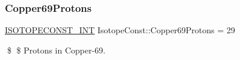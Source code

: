 \subsubsection{\texorpdfstring{Copper69\+Protons}{Copper69Protons}}
{\footnotesize\ttfamily \mbox{\hyperlink{group___isotope_const-_macros_ga5f18360b3e99483a35c32d789e62621c}{I\+S\+O\+T\+O\+P\+E\+C\+O\+N\+S\+T\+\_\+\+I\+NT}} Isotope\+Const\+::\+Copper69\+Protons = 29}

\$ \$ Protons in Copper-\/69. 
